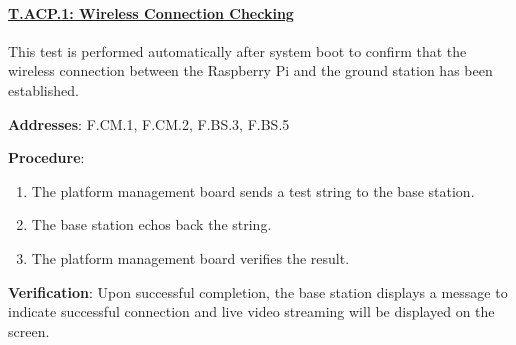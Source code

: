 \paragraph{\underline{T.ACP.1: Wireless Connection Checking}}

This test is performed automatically after system boot to confirm that the wireless connection between the Raspberry Pi and the ground station has been established.

\textbf{Addresses}: F.CM.1, F.CM.2, F.BS.3, F.BS.5

\textbf{Procedure}:
\begin{enumerate}[noitemsep]
    \item The platform management board sends a test string to the base station.
    \item The base station echos back the string.
    \item The platform management board verifies the result.
\end{enumerate}

\textbf{Verification}: 
Upon successful completion, the base station displays a message to indicate successful connection and live video streaming will be displayed on the screen.
